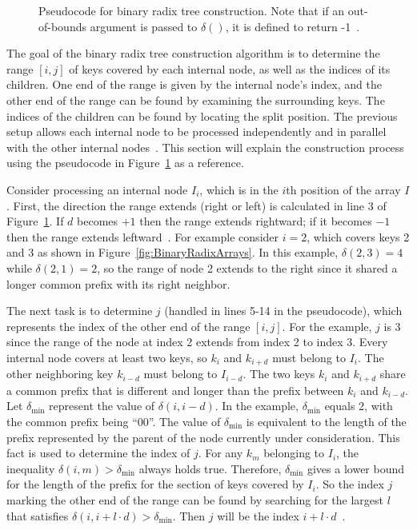 \documentclass{sig-alternate}
\begin{document}
\begin{figure}
\centering
{}
\caption{Pseudocode for binary radix tree construction. Note that if an out-of-bounds argument is passed to $\delta()$, it is defined to return -1~\cite{Karras:2012}.}
\label{fig:PseudoCode}
\end{figure}

The goal of the binary radix tree construction algorithm is to determine the range $[i,j]$ of keys covered by each internal node, as well as the indices of its children. One end of the range is given by the internal node's index, and the other end of the range can be found by examining the surrounding keys. The indices of the children can be found by locating the split position. The previous setup allows each internal node to be processed independently and in parallel with the other internal nodes~\cite{Karras:2012}. This section will explain the construction process using the pseudocode in Figure~\ref{fig:PseudoCode} as a reference.

Consider processing an internal node $I_{i}$, which is in the $i$th position of the array $I$. First, the direction the range extends (right or left) is calculated in line 3 of Figure~\ref{fig:PseudoCode}. If $d$ becomes $+1$ then the range extends rightward; if it becomes $-1$ then the range extends leftward~\cite{Karras:2012}. For example consider $i=2$, which covers keys 2 and 3 as shown in Figure~\ref{fig:BinaryRadixArrays}. In this example, $\delta(2,3) = 4$ while $\delta(2,1) = 2$, so the range of node 2 extends to the right since it shared a longer common prefix with its right neighbor.

The next task is to determine $j$ (handled in lines 5-14 in the pseudocode), which represents the index of the other end of the range $[i,j]$. For the example, $j$ is 3 since the range of the node at index 2 extends from index 2 to index 3. Every internal node covers at least two keys, so $k_i$ and $k_{i+d}$ must belong to $I_i$. The other neighboring key $k_{i-d}$ must belong to $I_{i-d}$. The two keys $k_i$ and $k_{i+d}$ share a common prefix that is different and longer than the prefix between $k_i$ and $k_{i-d}$. Let $\delta_{\textrm{min}}$ represent the value of $\delta(i, i-d)$. In the example, $\delta_{\textrm{min}}$ equals 2, with the common prefix being ``00''. The value of $\delta_{\textrm{min}}$ is equivalent to the length of the prefix represented by the parent of the node currently under consideration. This fact is used to determine the index of $j$. For any $k_m$ belonging to $I_i$, the inequality $\delta(i,m)>\delta_{\textrm{min}}$ always holds true. Therefore, $\delta_{\textrm{min}}$ gives a lower bound for the length of the prefix for the section of keys covered by $I_i$. So the index $j$ marking the other end of the range can be found by searching for the largest $l$ that satisfies $\delta(i, i+l \cdot d)>\delta_{\textrm{min}}$. Then $j$ will be the index $i+l \cdot d$~\cite{Karras:2012}.
\end{document}

